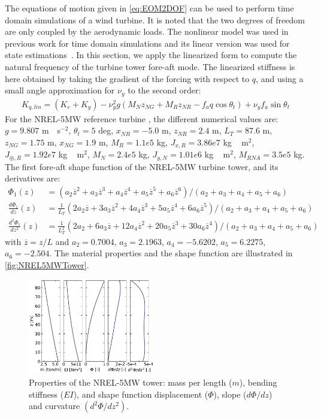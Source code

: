 \documentclass[wes, manuscript]{copernicus}
\renewcommand{\bar}{\overline}
\begin{document}
The equations of motion given in \autoref{eq:EOM2DOF} can be used to perform time domain simulations of a wind turbine.
It is noted that the two degrees of freedom are only coupled by the aerodynamic loads.
The nonlinear model was used in previous work for time domain simulations and its linear version was used for state estimations~\citep{Branlard:2020twin,Branlard:2020twinOF}.
In this section, we apply the linearized form to compute the natural frequency of the turbine tower fore-aft mode.
The linearized stiffness is here obtained by taking the gradient of the forcing with respect to $q$, and using a small angle approximation for $\nu_y$ to the second order:
\begin{align}
K_{q,lin}= (K_{e} + K_g)
- \nu_{y}^{2} g \left(M_N z_{NG} + M_{R} z_{NR} - f_a q \cos\theta_t\right)
+ \nu_{y} f_a \sin\theta_t 
\end{align}
For the NREL-5MW reference turbine \citep{nrel5mw}, the different numerical values are:
$g=9.807$ \unit{m\cdot s}$^{-2}$,
$\theta_t=5$ \unit{deg},
$x_{NR}=-5.0$ \unit{m},
$z_{NR}= 2.4$ \unit{m},
$L_T=87.6$ \unit{m},
$z_{NG}=1.75$ \unit{m},
$x_{NG}=1.9$ \unit{m},
$M_R= 1.1e5$ \unit{kg},
$J_{x,R}=3.86e7$ \unit{kg\,m}$^2$,
$J_{\oplus,R}=1.92e7$ \unit{kg\,m}$^2$,
$M_N=2.4e5$ \unit{kg},
$J_{y,N} =1.01e6$ \unit{kg\,m}$^2$,
$M_{RNA}=3.5e5$ \unit{kg}.
The first fore-aft shape function of the NREL-5MW turbine tower, and its derivatives are:
\begin{align}
   \Phi_1(z) &= (a_2 \bar{z}^2+ a_3 \bar{z}^3+ a_4 \bar{z}^4+ a_5 \bar{z}^5+ a_6 \bar{z}^6)/(a_2+a_3+a_4+a_5+a_6)\nonumber \\
   \frac{d\Phi_1}{dz}(z) &= \frac{1}{L_T}(2a_2 \bar{z}+ 3a_3 \bar{z}^2+ 4a_4 \bar{z}^3+ 5a_5 \bar{z}^4+ 6a_6 \bar{z}^5)/(a_2+a_3+a_4+a_5+a_6)\label{eq:ShapeFunctionsPoly}  \\  
   \frac{d^2\Phi_1}{dz^2}(z) &= \frac{1}{L_T^2}(2a_2+ 6a_3 \bar{z}+ 12a_4 \bar{z}^2+ 20a_5 \bar{z}^3+ 30a_6 \bar{z}^4)/(a_2+a_3+a_4+a_5+a_6) 
   \nonumber
\end{align}
with $\bar{z}=z/L$ and $a_2=0.7004$, $ a_3=2.1963$, $a_4=-5.6202$, $a_5=6.2275$, $a_6=-2.504$.
The material properties and the shape function are illustrated in \autoref{fig:NREL5MWTower}. 
\noindent\begin{figure}[!htb]\centering%
  \includegraphics[width=0.49\textwidth]{figs/NREL5MWTower.pdf}
  \caption{Properties of the NREL-5MW tower: mass per length ($m$), bending stiffness ($EI$), and shape function displacement ($\Phi$), slope ($d\Phi/dz$) and curvature $(d^2\Phi/dz^2)$.}\label{fig:NREL5MWTower}%
\end{figure}
\end{document}
